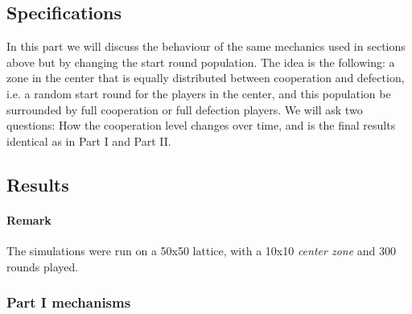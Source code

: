 \documentclass[letterpaper]{article}
\begin{document}
\subsection{Specifications}


In this part we will discuss the behaviour of the same mechanics used
in sections above but by changing the start round population. The idea is the
following: a zone in the center that is equally distributed
between cooperation and defection, i.e. a random start round for the
players in the center, and this population be surrounded by
full cooperation or full defection players. We will ask two questions:
How the cooperation level changes over time, and is the final results
identical as in Part I and Part II.

\subsection{Results}

\paragraph{Remark} The simulations were run on a 50x50 lattice, with
a 10x10 \textit{center zone} and 300 rounds played.

\subsubsection{Part I mechanisms}
\end{document}
